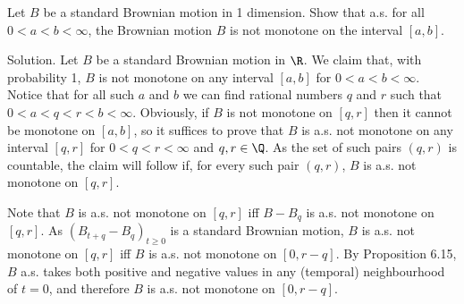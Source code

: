 \vspace{2mm}

\qcutline


\item Let $B$ be a standard Brownian motion in 1 dimension. Show that a.s. for all $0 < a < b < \infty$, the Brownian motion $B$ is not monotone on the interval $[a, b]$.

\scutline

Solution. Let $B$ be a standard Brownian motion in $\R$. We claim that, with probability 1, $B$ is not monotone on any interval $[a,b]$ for $0 < a < b < \infty$. Notice that for all such $a$ and $b$ we can find rational numbers $q$ and $r$ such that $0 < a < q < r < b < \infty$. Obviously, if $B$ is not monotone on $[q, r]$ then it cannot be monotone on $[a,b]$, so it suffices to prove that $B$ is a.s. not monotone on any interval $[q, r]$ for $0 < q < r < \infty$ and $q, r \in \Q$. As the set of such pairs $(q, r)$ is countable, the claim will follow if, for every such pair $(q, r)$, $B$ is a.s. not monotone on $[q, r]$.

Note that $B$ is a.s. not monotone on $[q, r]$ iff $B-B_q$ is a.s. not monotone on $[q, r]$. As $(B_{t+q}- B_q)_{t\geq 0}$ is a standard Brownian motion, $B$ is a.s. not monotone on $[q, r]$ iff $B$ is a.s. not monotone on $[0, r-q]$. By Proposition 6.15, $B$ a.s. takes both positive and negative values in any (temporal) neighbourhood of $t = 0$, and therefore $B$ is a.s. not monotone on $[0, r-q]$.

\vspace{2mm}

\qcutline

